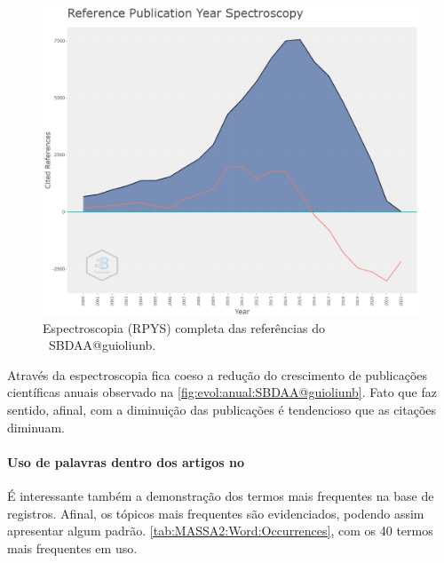 \begin{figure}
    \centering
    \includegraphics[width=1\textwidth]{experiments/guioliunb/AnaliseBibliometrica/SocialBigDataAnalysis/reference spectroscopy.png}
    \caption{Espectroscopia (RPYS) completa das referências do \dataset\ SBDAA@guioliunb.}
    \label{fig:MASSA2-ReferenceSpectroscopy}
\end{figure}

Através da espectroscopia fica coeso a redução do crescimento de publicações científicas anuais observado na \ref{fig:evol:anual:SBDAA@guioliunb}. Fato que faz sentido, afinal, com a diminuição das publicações é tendencioso que as citações diminuam.


\paragraph{Uso de palavras dentro dos artigos no \dataset}

É interessante também a demonstração dos termos mais frequentes na base de registros. Afinal, os tópicos mais frequentes são evidenciados, podendo assim apresentar algum padrão.
\ref{tab:MASSA2:Word:Occurrences}, com os 40 termos mais frequentes em uso.

